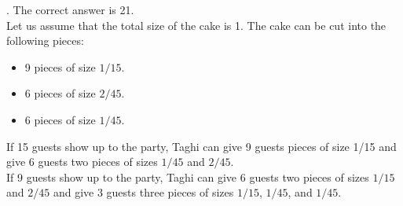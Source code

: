 \begin{solution}.
The correct answer is 21.\\[0.2cm]

Let us assume that the total size of the cake is 1. The cake can be cut into the following pieces:
\begin{itemize}
\item 9 pieces of size $1/15$.
\item 6 pieces of size $2/45$.
\item 6 pieces of size $1/45$.
\end{itemize}

If 15 guests show up to the party, Taghi can give 9 guests pieces of size  1/15 and give 6 guests two pieces of sizes $1/45$ and $2/45$.\\
If 9 guests show up to the party, Taghi can give 6 guests two pieces of sizes  $1/15$ and $2/45$ and give 3 guests three pieces of sizes $1/15$, $1/45$, and $1/45$.

\end{solution}